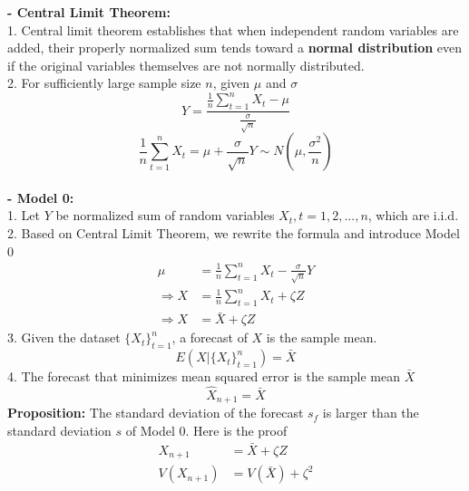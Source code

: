 \documentclass{article}
\begin{document}
\begin{enumerate}[S1 - ]
    \textbf{- Central Limit Theorem:}\\
    1. Central limit theorem establishes that when independent random variables are added, their properly normalized sum tends toward a \textbf{normal distribution} even if the original variables themselves are not normally distributed.\\
    2. For sufficiently large sample size $n$, given $\mu$ and $\sigma$
    \begin{equation*}
    Y = \frac{\frac{1}{n} \sum_{t=1}^{n} X_t-\mu}{\frac{\sigma}{\sqrt{n}}}
    \end{equation*}
    \begin{equation*}
    \frac{1}{n} \sum_{t=1}^{n} X_t = \mu +\frac{\sigma}{\sqrt{n}} Y \sim N\left(\mu,\frac{\sigma^2}{n}\right)
    \end{equation*}
    \\
    \textbf{- Model 0:}\\
    1. Let $Y$ be normalized sum of random variables $X_t, t=1,2,...,n$, which are i.i.d.\\
    2. Based on Central Limit Theorem, we rewrite the formula and introduce Model 0
    \begin{equation*}
    \begin{split}
    \mu & = \frac{1}{n} \sum_{t=1}^{n} X_t - \frac{\sigma}{\sqrt{n}} Y\\
    \Rightarrow X & = \frac{1}{n} \sum_{t=1}^{n} X_t + \zeta Z\\
    \Rightarrow X & = \bar{X} +\zeta Z
    \end{split}
    \end{equation*}
    3. Given the dataset $\{X_t\}_{t=1}^n$, a forecast of $X$ is the sample mean.
    \begin{equation*}
    E(X|\{X_t\}_{t=1}^n) = \bar{X}
    \end{equation*}
    4. The forecast that minimizes mean squared error is the sample mean $\bar{X}$
    \begin{equation*}
    \hat{X}_{n+1}=\bar{X}
    \end{equation*}
    \textbf{Proposition:} The standard deviation of the forecast $s_f$ is larger than the standard deviation $s$ of Model 0. Here is the proof\\
    \begin{equation*}
    \begin{split}
    X_{n+1} & = \bar{X} + \zeta Z\\
    V(X_{n+1}) & = V(\bar{X}) + \zeta^2\\

\end{split}
\end{equation*}
\end{enumerate}
\end{document}

